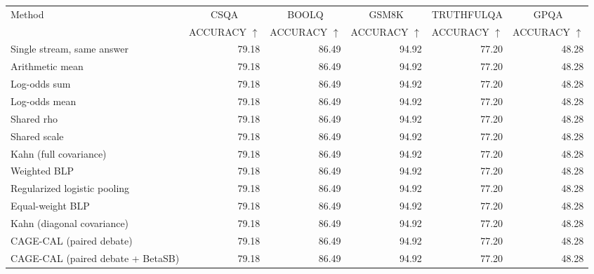 \begin{tabular}{lrrrrr}
\toprule
Method & \multicolumn{1}{c}{CSQA} & \multicolumn{1}{c}{BOOLQ} & \multicolumn{1}{c}{GSM8K} & \multicolumn{1}{c}{TRUTHFULQA} & \multicolumn{1}{c}{GPQA} \\
 & ACCURACY $\uparrow$ & ACCURACY $\uparrow$ & ACCURACY $\uparrow$ & ACCURACY $\uparrow$ & ACCURACY $\uparrow$ \\
\midrule
Single stream, same answer & 79.18 & 86.49 & 94.92 & 77.20 & 48.28 \\
Arithmetic mean & 79.18 & 86.49 & 94.92 & 77.20 & 48.28 \\
Log-odds sum & 79.18 & 86.49 & 94.92 & 77.20 & 48.28 \\
Log-odds mean & 79.18 & 86.49 & 94.92 & 77.20 & 48.28 \\
Shared rho & 79.18 & 86.49 & 94.92 & 77.20 & 48.28 \\
Shared scale & 79.18 & 86.49 & 94.92 & 77.20 & 48.28 \\
Kahn (full covariance) & 79.18 & 86.49 & 94.92 & 77.20 & 48.28 \\
Weighted BLP & 79.18 & 86.49 & 94.92 & 77.20 & 48.28 \\
Regularized logistic pooling & 79.18 & 86.49 & 94.92 & 77.20 & 48.28 \\
Equal-weight BLP & 79.18 & 86.49 & 94.92 & 77.20 & 48.28 \\
Kahn (diagonal covariance) & 79.18 & 86.49 & 94.92 & 77.20 & 48.28 \\
CAGE-CAL (paired debate) & 79.18 & 86.49 & 94.92 & 77.20 & 48.28 \\
CAGE-CAL (paired debate + BetaSB) & 79.18 & 86.49 & 94.92 & 77.20 & 48.28 \\
\bottomrule
\end{tabular}
